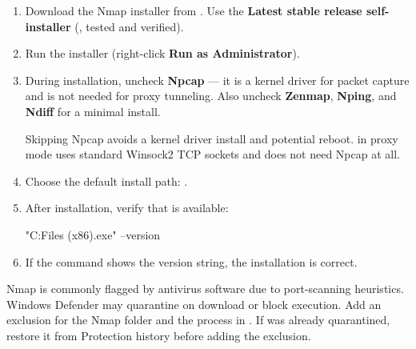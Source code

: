 \documentclass{guide}
\begin{document}
\stepbystep
\begin{enumerate}
  \item Download the Nmap installer from
        .
        Use the \textbf{Latest stable release self-installer}
        (, tested and verified).

  \item Run the installer (right-click \textbf{Run as Administrator}).

  \item During installation, uncheck \textbf{Npcap} --- it is a kernel driver
        for packet capture and is not needed for proxy tunneling. Also uncheck
        \textbf{Zenmap}, \textbf{Nping}, and \textbf{Ndiff} for a minimal install.


  \begin{tip}
  Skipping Npcap avoids a kernel driver install and potential reboot.
   in proxy mode uses standard Winsock2 TCP sockets and does
  not need Npcap at all.
  \end{tip}

  \item Choose the default install path:
        .

  \item After installation, verify that  is available:

  \begin{code}[bash]
"C:\Program Files (x86)\Nmap\ncat.exe" --version
  \end{code}

  \item If the command shows the version string, the installation is correct.
\end{enumerate}

\begin{warning}
Nmap is commonly flagged by antivirus software due to port-scanning heuristics.
Windows Defender may quarantine  on download or block
execution. Add an exclusion for the Nmap folder and the 
process in .
If  was already quarantined,
restore it from Protection history before adding the exclusion.
\end{warning}
\end{document}
